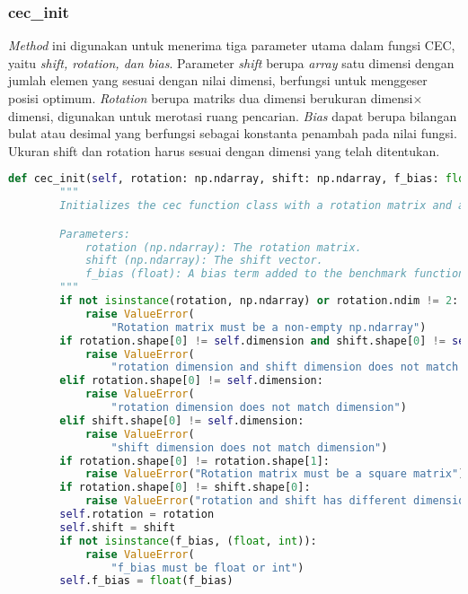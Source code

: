 \subsubsection{cec\_init}
\textit{Method} ini digunakan untuk menerima tiga parameter utama dalam fungsi CEC, yaitu \textit{shift, rotation, dan bias}. Parameter \textit{shift} berupa \textit{array} satu dimensi dengan jumlah elemen yang sesuai dengan nilai dimensi, berfungsi untuk menggeser posisi optimum. \textit{Rotation} berupa matriks dua dimensi berukuran dimensi$\times$dimensi, digunakan untuk merotasi ruang pencarian. \textit{Bias} dapat berupa bilangan bulat atau desimal yang berfungsi sebagai konstanta penambah pada nilai fungsi. Ukuran shift dan rotation harus sesuai dengan dimensi yang telah ditentukan.
\begin{lstlisting}[language=Python, caption=\textit{method} untuk tambahan konstruktor untuk fungsi CEC, label=lst:init_cec]
    def cec_init(self, rotation: np.ndarray, shift: np.ndarray, f_bias: float = 0) -> None:
        """
        Initializes the cec function class with a rotation matrix and a shift vector.

        Parameters:
            rotation (np.ndarray): The rotation matrix.
            shift (np.ndarray): The shift vector.
            f_bias (float): A bias term added to the benchmark function's output. Defaults to 0.
        """
        if not isinstance(rotation, np.ndarray) or rotation.ndim != 2:
            raise ValueError(
                "Rotation matrix must be a non-empty np.ndarray")
        if rotation.shape[0] != self.dimension and shift.shape[0] != self.dimension:
            raise ValueError(
                "rotation dimension and shift dimension does not match dimension")
        elif rotation.shape[0] != self.dimension:
            raise ValueError(
                "rotation dimension does not match dimension")
        elif shift.shape[0] != self.dimension:
            raise ValueError(
                "shift dimension does not match dimension")
        if rotation.shape[0] != rotation.shape[1]:
            raise ValueError("Rotation matrix must be a square matrix")
        if rotation.shape[0] != shift.shape[0]:
            raise ValueError("rotation and shift has different dimensions")
        self.rotation = rotation
        self.shift = shift
        if not isinstance(f_bias, (float, int)):
            raise ValueError(
                "f_bias must be float or int")
        self.f_bias = float(f_bias)
\end{lstlisting}
